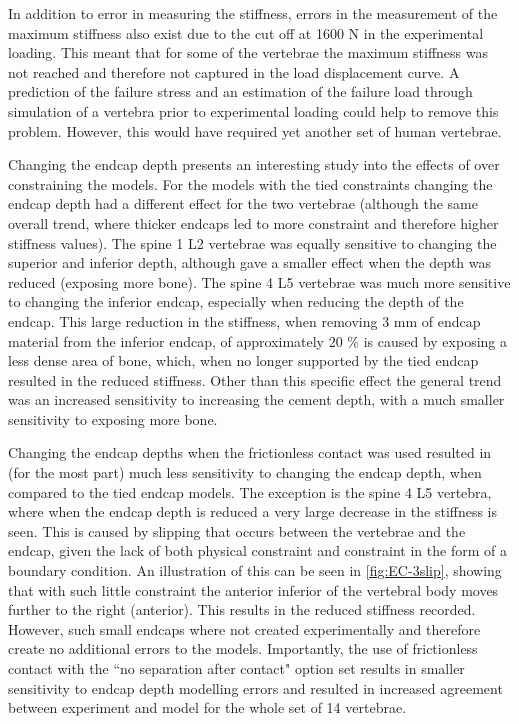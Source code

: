 In addition to error in measuring the stiffness, errors in the measurement of
the maximum stiffness also exist due to the cut off at 1600 N in the
experimental loading. This meant that for some of the vertebrae the maximum
stiffness was not reached and therefore not captured in the load displacement
curve. A prediction of the failure stress and an estimation of the failure
load through simulation of a vertebra prior to experimental loading
could help to remove this problem. However, this would have required yet
another set of human vertebrae.

Changing the endcap depth presents an interesting study into the effects of
over constraining the models. For the models with the tied constraints changing
the endcap depth had a different effect for the two vertebrae (although the
same overall trend, where thicker endcaps led to more constraint and therefore
higher stiffness values). The spine 1 L2 vertebrae was equally sensitive to
changing the superior and inferior depth, although gave a smaller effect when
the depth was reduced (exposing more bone). The spine 4 L5 vertebrae was much
more sensitive to changing the inferior endcap, especially when reducing the
depth of the endcap. This large reduction in the stiffness, when removing 3 mm
of endcap material from the inferior endcap, of approximately 20 \% is caused
by exposing a less dense area of bone, which, when no longer supported by the
tied endcap resulted in the reduced stiffness. Other than this specific effect
the general trend was an increased sensitivity to increasing the cement depth,
with a much smaller sensitivity to exposing more bone.

Changing the endcap depths when the frictionless contact was used resulted in
(for the most part) much less sensitivity to changing the endcap depth, when
compared to the tied endcap models. The exception is the spine 4 L5 vertebra,
where when the endcap depth is reduced a very large decrease in the stiffness
is seen. This is caused by slipping that occurs between the vertebrae and the
endcap, given the lack of both physical constraint and constraint in the form
of a boundary condition. An illustration of this can be seen in
\cref{fig:EC-3slip}, showing that with such little constraint the anterior
inferior of the vertebral body moves further to the right (anterior). This
results in the reduced stiffness recorded. However, such small endcaps where
not created experimentally and therefore create no additional errors to the
models.  Importantly, the use of frictionless contact with the ``no separation
after contact" option set results in smaller sensitivity to endcap depth
modelling errors and resulted in increased agreement between experiment and
model for the whole set of 14 vertebrae.


